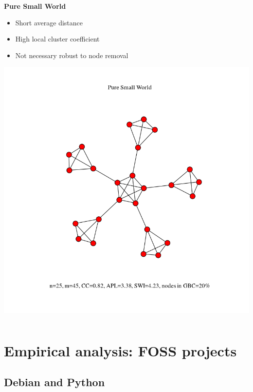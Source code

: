 \documentclass[ignorenonframetext,red,8pt,notes=hide]{beamer}
\begin{document}
\begin{frame}
\begin{columns}[c]
\begin{column}{0.33\textwidth}
\begin{center}
\textbf{Pure Small World}
\end{center}
\begin{itemize}
\item Short average distance
\item High local cluster coefficient
\item Not necessary robust to node removal
\end{itemize}
\includegraphics[scale=0.2]{../../figures/model_small_world_25}
\end{column}
\end{columns}

\end{frame}


\section{Empirical analysis: FOSS projects}

\subsection{Debian and Python}
\end{document}
